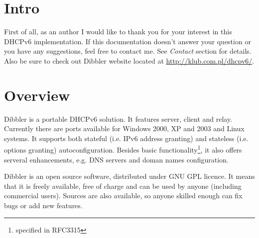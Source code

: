 
\section{Intro}
First of all, as an author I would like to thank you for your interest
in this DHCPv6 implementation. If this documentation doesn't answer
your question or you have any suggestions, feel free to contact
me. See \emph{Contact} section for details. Also be sure to check out
Dibbler website located at \url{http://klub.com.pl/dhcpv6/}.


\section{Overview}

Dibbler is a portable DHCPv6 solution. It features server, client and
relay. Currently there are ports available for Windows 2000, XP and 2003
and Linux systems. It supports both stateful (i.e. IPv6 address
granting) and stateless (i.e. options granting) autoconfiguration.
Besides basic functionality\footnote{specified in RFC3315}, it also offers
serveral enhancements, e.g. DNS servers and doman names
configuration.

Dibbler is an open source software, distributed under GNU GPL
licence. It means that it is freely available, free of charge and can
be used by anyone (including commercial users). Sources are also
available, so anyone skilled enough can fix bugs or add new features.

